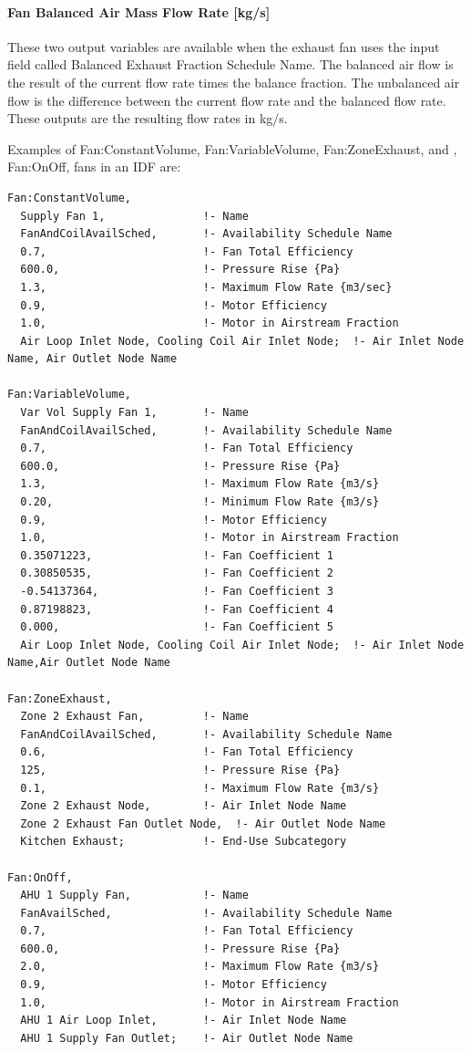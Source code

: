 \paragraph{Fan Balanced Air Mass Flow Rate {[}kg/s{]}}\label{fan-balanced-air-mass-flow-rate-kgs}

These two output variables are available when the exhaust fan uses the input field called Balanced Exhaust Fraction Schedule Name. The balanced air flow is the result of the current flow rate times the balance fraction. The unbalanced air flow is the difference between the current flow rate and the balanced flow rate. These outputs are the resulting flow rates in kg/s.

Examples of Fan:ConstantVolume, Fan:VariableVolume, Fan:ZoneExhaust, and , Fan:OnOff, fans in an IDF are:

\begin{lstlisting}
Fan:ConstantVolume,
  Supply Fan 1,               !- Name
  FanAndCoilAvailSched,       !- Availability Schedule Name
  0.7,                        !- Fan Total Efficiency
  600.0,                      !- Pressure Rise {Pa}
  1.3,                        !- Maximum Flow Rate {m3/sec}
  0.9,                        !- Motor Efficiency
  1.0,                        !- Motor in Airstream Fraction
  Air Loop Inlet Node, Cooling Coil Air Inlet Node;  !- Air Inlet Node Name, Air Outlet Node Name

Fan:VariableVolume,
  Var Vol Supply Fan 1,       !- Name
  FanAndCoilAvailSched,       !- Availability Schedule Name
  0.7,                        !- Fan Total Efficiency
  600.0,                      !- Pressure Rise {Pa}
  1.3,                        !- Maximum Flow Rate {m3/s}
  0.20,                       !- Minimum Flow Rate {m3/s}
  0.9,                        !- Motor Efficiency
  1.0,                        !- Motor in Airstream Fraction
  0.35071223,                 !- Fan Coefficient 1
  0.30850535,                 !- Fan Coefficient 2
  -0.54137364,                !- Fan Coefficient 3
  0.87198823,                 !- Fan Coefficient 4
  0.000,                      !- Fan Coefficient 5
  Air Loop Inlet Node, Cooling Coil Air Inlet Node;  !- Air Inlet Node Name,Air Outlet Node Name

Fan:ZoneExhaust,
  Zone 2 Exhaust Fan,         !- Name
  FanAndCoilAvailSched,       !- Availability Schedule Name
  0.6,                        !- Fan Total Efficiency
  125,                        !- Pressure Rise {Pa}
  0.1,                        !- Maximum Flow Rate {m3/s}
  Zone 2 Exhaust Node,        !- Air Inlet Node Name
  Zone 2 Exhaust Fan Outlet Node,  !- Air Outlet Node Name
  Kitchen Exhaust;            !- End-Use Subcategory

Fan:OnOff,
  AHU 1 Supply Fan,           !- Name
  FanAvailSched,              !- Availability Schedule Name
  0.7,                        !- Fan Total Efficiency
  600.0,                      !- Pressure Rise {Pa}
  2.0,                        !- Maximum Flow Rate {m3/s}
  0.9,                        !- Motor Efficiency
  1.0,                        !- Motor in Airstream Fraction
  AHU 1 Air Loop Inlet,       !- Air Inlet Node Name
  AHU 1 Supply Fan Outlet;    !- Air Outlet Node Name
\end{lstlisting}


